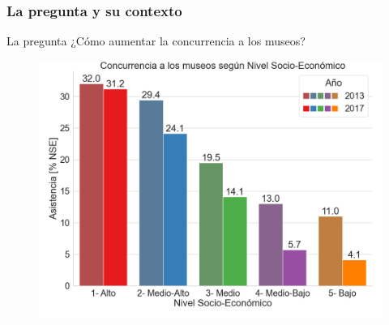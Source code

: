 \documentclass{beamer}
\begin{document}
\begin{frame}
\frametitle{La pregunta y su contexto}

\begin{block}{La pregunta}
¿Cómo aumentar la concurrencia a los museos?
\end{block}

\begin{figure}
\centering
\includegraphics[height=0.6\textheight]{asist_museo_nse_x100}
\label{fig:asist_museo_nse}
\end{figure}

\end{frame}
\end{document}
